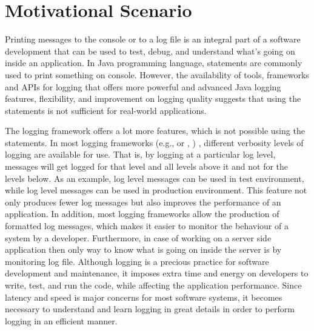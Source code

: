 

\chapter{Motivational Scenario}  \label{ch2}

Printing messages to the console or to a log file is an integral part of a software development that can be used to test, debug, and understand what’s going on inside an application. In Java programming language,  statements
are commonly used to print something on console. However, the availability of tools, frameworks and APIs for logging that offers more powerful and advanced Java logging features, flexibility, and improvement on logging quality suggests that using the  statements is not sufficient for real-world applications. 


The logging framework offers a lot more features, which is not possible using the  statements. In most logging frameworks (e.g.,  or , ) , different verbosity levels of logging are available for use. That is, by logging at a particular log level, messages will get logged for that level and all levels above it and not for the levels below. As an example,  log level messages can be used in test environment, while  log level messages can be used in production environment. This feature not only produces fewer log messages but also improves the performance of an application. In addition, most logging frameworks allow the production of formatted log messages, which makes it easier to monitor the behaviour of a system by a developer. Furthermore, in case of working on a server side application then only way to know what is going on inside the server is by monitoring log file. Although logging is a precious practice for software development and maintenance, it imposes extra time and energy on developers to write, test, and run the code, while affecting the application performance. Since latency and speed is major concerns for most software systems, it becomes necessary to understand and learn logging in great details in order to perform logging in an efficient manner.

